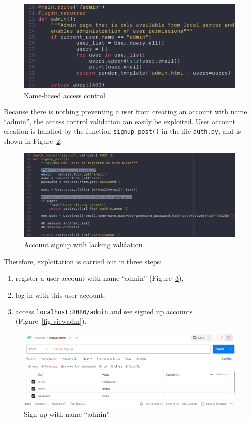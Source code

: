 \documentclass[parskip=half]{scrartcl}
\newcommand{\figref}[1]{Figure~\ref{#1}}
\begin{document}
\begin{figure}
    \centering
    \includegraphics[width=\textwidth]{code_admincomp}
    \caption{Name-based access control}
    \label{fig:code:admincomp}
\end{figure}

Because there is nothing preventing a user from creating an account with name
``admin'', the access control validation can easily be exploited. User account
creation is handled by the function \texttt{signup\_post()} in the file
\texttt{auth.py}, and is shown in \figref{fig:code:signup}.

\begin{figure}
    \centering
    \includegraphics[width=\textwidth]{code_acccreate}
    \caption{Account signup with lacking validation}
    \label{fig:code:signup}
\end{figure}

Therefore, exploitation is carried out in three steps:
\begin{enumerate}
    \item register a user account with name ``admin'' (\figref{fig:sigadm}),
    \item log-in with this user account,
    \item access \texttt{localhost:8080/admin} and see signed up accounts
    (\figref{fig:viewadm}).
\end{enumerate}

\begin{figure}
    \centering
    \includegraphics[width=\textwidth]{signup_admin}
    \caption{Sign up with name ``admin''}
    \label{fig:sigadm}
\end{figure}
\end{document}
